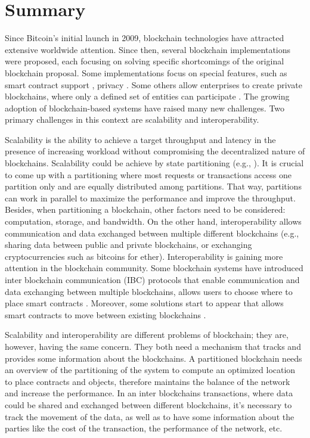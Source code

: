 \newpage
\thispagestyle{empty}
\section{Summary}
Since Bitcoin's initial launch in 2009, blockchain technologies have attracted
extensive worldwide attention. Since then, several blockchain implementations
were proposed, each focusing on solving specific shortcomings of the original
blockchain proposal. Some implementations focus on special features, such as
smart contract support \cite{buterin2013ethereum, elrom2019neo}, privacy
\cite{alonso2018monero}. Some others allow enterprises to create private
blockchains, where only a defined set of entities can participate
\cite{androulaki2018hyperledger}. The growing adoption of blockchain-based
systems have raised many new challenges. Two primary challenges in this context
are scalability and interoperability. 

Scalability is the ability to achieve a target throughput and latency in the
presence of increasing workload without compromising the decentralized nature of
blockchains. Scalability could be achieve by state partitioning (e.g.,
\cite{facebookTAO, sciascia2012sdur, aguilera2007sinfonia}). It is crucial to
come up with a partitioning where most requests or transactions access one
partition only and are equally distributed among partitions. That way,
partitions can work in parallel to maximize the performance and improve the
throughput. Besides, when partitioning a blockchain, other factors need to be
considered: computation, storage, and bandwidth. On the other hand,
interoperability allows communication and data exchanged between multiple
different blockchains (e.g., sharing data between public and private
blockchains, or exchanging cryptocurrencies such as bitcoins for ether).
Interoperability is gaining more attention in the blockchain community. Some
blockchain systems have introduced inter blockchain communication (IBC)
protocols that enable communication and data exchanging between multiple
blockchains, allows users to choose where to place smart contracts
\cite{kwon2016cosmos, thomas2015protocol, kokoris2018omniledger,
al2017chainspace}. Moreover, some solutions start to appear that allows smart
contracts to move between existing blockchains \cite{fynn2020move, back2014enabling,
herlihy2018atomic}. 

Scalability and interoperability are different problems of blockchain; they are,
however, having the same concern. They both need a mechanism that tracks and
provides some information about the blockchains. A partitioned blockchain needs
an overview of the partitioning of the system to compute an optimized location
to place contracts and objects, therefore maintains the balance of the network
and increase the performance. In an inter blockchains transactions, where data
could be shared and exchanged between different blockchains, it's necessary to
track the movement of the data, as well as to have some information about the
parties like the cost of the transaction, the performance of the network, etc.

